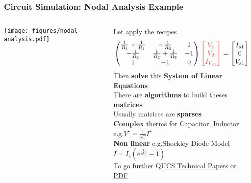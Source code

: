 \begin{frame}
  \frametitle{Circuit Simulation: Nodal Analysis Example}
  \begin{columns}
    \begin{column}{.3\textwidth}
      \begin{center}
        \texttt{[image: figures/nodal-analysis.pdf]}
      \end{center}
    \end{column}
    \begin{column}{.7\textwidth}
      Let apply the recipes %
      $$
      \begin{pmatrix}
        \frac{1}{R_1}+\frac{1}{R_2} & -\frac{1}{R_2} & 1 \\
        -\frac{1}{R_2} & \frac{1}{R_2}+\frac{1}{R_3} & -1 \\
        1 & -1 & 0
      \end{pmatrix}
      { \color{red!80}
      \begin{bmatrix}
        V_1 \\
        V_2 \\
        I_{V_{s1}}
      \end{bmatrix}
      }
      =
      \begin{bmatrix}
        I_{s1} \\
        0 \\
        V_{s1}
      \end{bmatrix}
      $$
      Then \textbf{solve} this \textbf{System of Linear Equations} \\[1em]
      There are \textbf{algorithms} to build theses \textbf{matrices} \\
      Usually matrices are \textbf{sparses} \\[1em]
      \textbf{Complex} therms for Capacitor, Inductor e.g.\@ $V^\star = \frac{1}{sC} I^\star$ %
      \\[.5em]
      \textbf{Non linear} e.g.\@ Shockley Diode Model $I = I_s \left( e^{\frac{V}{n V_T}} - 1 \right)$
      \\[1em]
      {\tiny
        To go further \href{http://qucs.sourceforge.net/tech/technical.html}{QUCS Technical Papers}
        or \href{http://qucs.sourceforge.net/docs/technical/technical.pdf}{PDF}
      }
    \end{column}
  \end{columns}
\end{frame}

